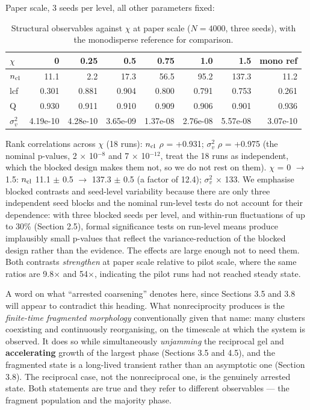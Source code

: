 \documentclass[aps,pre,preprint,superscriptaddress,nofootinbib,longbibliography]{revtex4-2}
\begin{document}
Paper scale, 3 seeds per level, all other parameters fixed:

\begin{table}[htbp]
\caption{Structural observables against $\chi$ at paper scale ($N=4000$, three seeds), with the monodisperse reference for comparison.}
\label{tab:2}
\begin{ruledtabular}
\begin{tabular}{lrrrrrrr}
$\chi$ & 0 & 0.25 & 0.5 & 0.75 & 1.0 & 1.5 & mono ref \\
\hline
$n_{\rm cl}$ & 11.1 & 2.2 & 17.3 & 56.5 & 95.2 & 137.3 & 11.2 \\
lcf & 0.301 & 0.881 & 0.904 & 0.800 & 0.791 & 0.753 & 0.261 \\
Q & 0.930 & 0.911 & 0.910 & 0.909 & 0.906 & 0.901 & 0.936 \\
$\sigma^2_v$ & 4.19e-10 & 4.28e-10 & 3.65e-09 & 1.37e-08 & 2.76e-08 & 5.57e-08 & 3.07e-10 \\
\end{tabular}
\end{ruledtabular}
\end{table}

Rank correlations across $\chi$ (18 runs): $n_{\rm cl}$ $\rho$ = +0.931; $\sigma^2_v$ $\rho$ = +0.975 (the nominal p-values, 2 $\times$ 10$^{-8}$ and 7 $\times$ 10$^{-12}$, treat the 18 runs as independent, which the blocked design makes them not, so we do not rest on them). $\chi$ = 0 $\rightarrow$ 1.5: $n_{\rm cl}$ 11.1 $\pm$ 0.5 $\rightarrow$ 137.3 $\pm$ 0.5 (a factor of 12.4); $\sigma^2_v$ $\times$ 133. We emphasise blocked contrasts and seed-level variability because there are only three independent seed blocks and the nominal run-level tests do not account for their dependence: with three blocked seeds per level, and within-run fluctuations of up to 30\% (Section 2.5), formal significance tests on run-level means produce implausibly small p-values that reflect the variance-reduction of the blocked design rather than the evidence. The effects are large enough not to need them. Both contrasts \emph{strengthen} at paper scale relative to pilot scale, where the same ratios are 9.8$\times$ and 54$\times$, indicating the pilot runs had not reached steady state.

A word on what ``arrested coarsening'' denotes here, since Sections 3.5 and 3.8 will appear to contradict this heading. What nonreciprocity produces is the \emph{finite-time fragmented morphology} conventionally given that name: many clusters coexisting and continuously reorganising, on the timescale at which the system is observed. It does so while simultaneously \emph{unjamming} the reciprocal gel and \textbf{accelerating} growth of the largest phase (Sections 3.5 and 4.5), and the fragmented state is a long-lived transient rather than an asymptotic one (Section 3.8). The reciprocal case, not the nonreciprocal one, is the genuinely arrested state. Both statements are true and they refer to different observables --- the fragment population and the majority phase.
\end{document}
